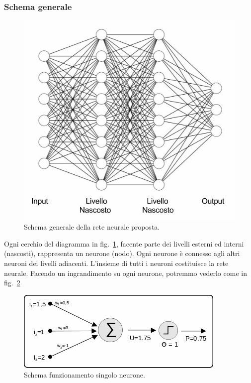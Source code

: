 \documentclass[10pt,a4paper]{report}
\begin{document}
\subsubsection*{Schema generale}
\begin{figure}[p]
\centering
\includegraphics[scale=.6]{DNN}
\caption{Schema generale della rete neurale proposta.}
\label{deep}
\end{figure}

Ogni cerchio del diagramma in fig.~\ref{deep}, facente parte dei livelli esterni ed interni (nascosti), rappresenta un neurone (nodo). Ogni neurone è connesso agli altri neuroni dei livelli adiacenti. L'insieme di tutti i neuroni costituisce la rete neurale. Facendo un ingrandimento su ogni neurone, potremmo vederlo come in fig.~\ref{somme}

\begin{figure}[p]
\centering
\includegraphics[scale=.6]{somme_neuroni}
\caption{Schema funzionamento singolo neurone.}
\label{somme}
\end{figure}
\end{document}
